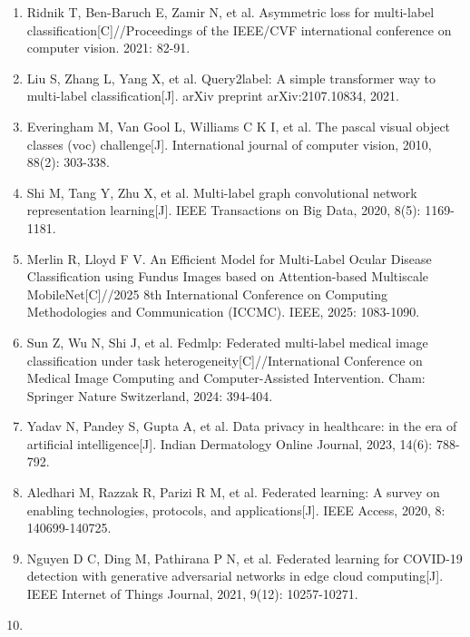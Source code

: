 \begin{enumerate}
\item
  \protect{}\label{_Ref213949927}{}Ridnik T, Ben-Baruch E, Zamir N, et al. Asymmetric loss for multi-label classification{[}C{]}//Proceedings of the IEEE/CVF international conference on computer vision. 2021: 82-91.
\item
  \protect{}\label{_Ref213950246}{}Liu S, Zhang L, Yang X, et al. Query2label: A simple transformer way to multi-label classification{[}J{]}. arXiv preprint arXiv:2107.10834, 2021.
\item
  \protect{}\label{_Ref213950282}{}Everingham M, Van Gool L, Williams C K I, et al. The pascal visual object classes (voc) challenge{[}J{]}. International journal of computer vision, 2010, 88(2): 303-338.
\item
  \protect{}\label{_Ref213950338}{}Shi M, Tang Y, Zhu X, et al. Multi-label graph convolutional network representation learning{[}J{]}. IEEE Transactions on Big Data, 2020, 8(5): 1169-1181.
\item
  \protect{}\label{_Ref213950343}{}Merlin R, Lloyd F V. An Efficient Model for Multi-Label Ocular Disease Classification using Fundus Images based on Attention-based Multiscale MobileNet{[}C{]}//2025 8th International Conference on Computing Methodologies and Communication (ICCMC). IEEE, 2025: 1083-1090.
\item
  \protect{}\label{_Ref213950349}{}Sun Z, Wu N, Shi J, et al. Fedmlp: Federated multi-label medical image classification under task heterogeneity{[}C{]}//International Conference on Medical Image Computing and Computer-Assisted Intervention. Cham: Springer Nature Switzerland, 2024: 394-404.
\item
  \protect{}\label{_Ref213950358}{}Yadav N, Pandey S, Gupta A, et al. Data privacy in healthcare: in the era of artificial intelligence{[}J{]}. Indian Dermatology Online Journal, 2023, 14(6): 788-792.
\item
  \protect{}\label{_Ref213950376}{}Aledhari M, Razzak R, Parizi R M, et al. Federated learning: A survey on enabling technologies, protocols, and applications{[}J{]}. IEEE Access, 2020, 8: 140699-140725.
\item
  \protect{}\label{_Ref213950381}{}Nguyen D C, Ding M, Pathirana P N, et al. Federated learning for COVID-19 detection with generative adversarial networks in edge cloud computing{[}J{]}. IEEE Internet of Things Journal, 2021, 9(12): 10257-10271.
\item

\end{enumerate}
